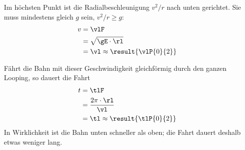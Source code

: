 \begin{center}
\end{center}

\begin{abcliste}
\abc Im höchsten Punkt ist die Radialbeschleunigung $v^2/r$ nach unten gerichtet. Sie muss mindestens gleich $g$ sein, $v^2/r \geq g$:
\begin{align}
 v &= \vlF \\
   &= \sqrt{\gE\cdot\rl} \\
   &= \vl \approx \result{\vlP{0}{2}}
\end{align}

\abc Fährt die Bahn mit dieser Geschwindigkeit gleichförmig durch den ganzen Looping, so dauert die Fahrt
\begin{align}
 t &= \tlF \\
   &= \frac{2\pi\cdot\rl}{\vl} \\
   &= \tl \approx \result{\tlP{0}{2}}
\end{align}
In Wirklichkeit ist die Bahn unten schneller als oben; die Fahrt dauert deshalb etwas weniger lang.
\end{abcliste}
